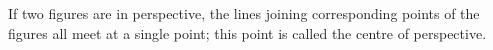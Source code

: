 If two figures are in perspective, the lines joining corresponding
points of the figures all meet at a single point;
this point is called the centre of perspective.